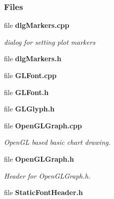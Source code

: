 \subsubsection*{Files}
\begin{DoxyCompactItemize}
\item 
file {\bf dlg\+Markers.\+cpp}
\begin{DoxyCompactList}\small\item\em dialog for setting plot markers \end{DoxyCompactList}\item 
file {\bf dlg\+Markers.\+h}
\item 
file {\bf G\+L\+Font.\+cpp}
\item 
file {\bf G\+L\+Font.\+h}
\item 
file {\bf G\+L\+Glyph.\+h}
\item 
file {\bf Open\+G\+L\+Graph.\+cpp}
\begin{DoxyCompactList}\small\item\em Open\+GL based basic chart drawing. \end{DoxyCompactList}\item 
file {\bf Open\+G\+L\+Graph.\+h}
\begin{DoxyCompactList}\small\item\em Header for Open\+G\+L\+Graph.\+h. \end{DoxyCompactList}\item 
file {\bf Static\+Font\+Header.\+h}
\end{DoxyCompactItemize}
